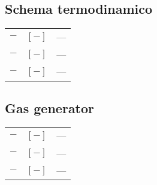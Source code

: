 \begin{multicols}{2}
	\subsection{Schema termodinamico}
	\begin{tabularx}{\linewidth}{cc>{\raggedright\arraybackslash}X}
		$\bm{-}$ & $[-]$ & --- \\
		$\bm{-}$ & $[-]$ & --- \\
		$\bm{-}$ & $[-]$ & ---
	\end{tabularx}

	\subsection{Gas generator}
	\begin{tabularx}{\linewidth}{cc>{\raggedright\arraybackslash}X}
		$\bm{-}$ & $[-]$ & --- \\
		$\bm{-}$ & $[-]$ & --- \\
		$\bm{-}$ & $[-]$ & ---
	\end{tabularx}
	

\end{multicols}
